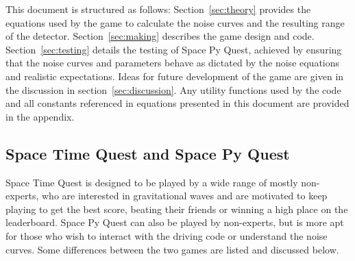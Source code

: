 \documentclass{article}
\begin{document}
This document is structured as follows:
Section~\ref{sec:theory} provides the equations used by the game to
calculate the noise curves and the resulting range of the detector. 
Section~\ref{sec:making} describes the game design and 
code. Section~\ref{sec:testing} details the testing of Space Py Quest,
achieved by ensuring that the noise curves and parameters behave as
dictated by the noise equations and realistic expectations. Ideas for
future development of the game are given in the discussion in 
section~\ref{sec:discussion}. Any utility functions used by the code and all
constants referenced in equations presented in this document are
provided in the appendix. 

\subsection{Space Time Quest and Space Py Quest}
\label{sec::differences}
Space Time Quest is designed to be played by a wide range of mostly
non-experts, who are interested in gravitational waves and are motivated
to keep playing to get the best score, beating their
friends or winning a high place on the leaderboard. Space Py Quest can also
be played by non-experts, but is more apt for those who wish to
interact with the driving code or understand the noise curves. Some
differences between the two games are listed and discussed
below.
\end{document}
